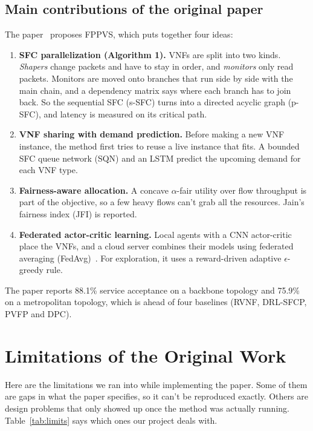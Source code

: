 \documentclass[11pt,a4paper]{article}
\begin{document}
\subsection{Main contributions of the original paper}
The paper~\cite{fppvs} proposes FPPVS, which puts together four ideas:
\begin{enumerate}
  \item \textbf{SFC parallelization (Algorithm 1).} VNFs are split into two
  kinds. \emph{Shapers} change packets and have to stay in order, and
  \emph{monitors} only read packets. Monitors are moved onto branches that run
  side by side with the main chain, and a dependency matrix says where each
  branch has to join back. So the sequential SFC (s-SFC) turns into a directed
  acyclic graph (p-SFC), and latency is measured on its critical path.
  \item \textbf{VNF sharing with demand prediction.} Before making a new VNF
  instance, the method first tries to reuse a live instance that fits. A
  bounded SFC queue network (SQN) and an LSTM predict the upcoming demand for
  each VNF type.
  \item \textbf{Fairness-aware allocation.} A concave $\alpha$-fair utility over
  flow throughput is part of the objective, so a few heavy flows can't grab all
  the resources. Jain's fairness index (JFI) is reported.
  \item \textbf{Federated actor-critic learning.} Local agents with a CNN
  actor-critic place the VNFs, and a cloud server combines their models using
  federated averaging (FedAvg)~\cite{fedavg}. For exploration, it uses a
  reward-driven adaptive $\epsilon$-greedy rule.
\end{enumerate}
The paper reports 88.1\% service acceptance on a backbone topology and 75.9\% on
a metropolitan topology, which is ahead of four baselines (RVNF, DRL-SFCP, PVFP
and DPC).

\section{Limitations of the Original Work}

Here are the limitations we ran into while implementing the paper. Some of them
are gaps in what the paper specifies, so it can't be reproduced exactly. Others
are design problems that only showed up once the method was actually running.
Table~\ref{tab:limits} says which ones our project deals with.
\end{document}
